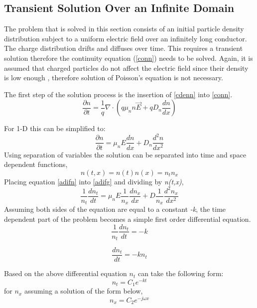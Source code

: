 \begin{doublespace}
\subsection{Transient Solution Over an Infinite Domain}

The problem that is solved in this section consists of an initial particle density distribution subject to a uniform electric field over an infinitely long conductor. The charge distribution drifts and diffuses over time. This requires a transient solution  therefore the continuity equation (\ref{conn}) needs to be solved. Again, it is assumed that charged particles do not affect the electric field since their density is low enough , therefore solution of Poisson's equation is not necessary. 

The first step of the solution process is the insertion of \eqref{cdenn} into \eqref{conn}.
\begin{equation}
\frac{\partial n}{\partial t} = \frac{1}{q}\nabla \cdot (q \mu_{n} n \vec{E}+qD_{n} \frac{dn}{dx} )
\end{equation}

For 1-D this can be simplified to:
\begin{equation}
\frac{\partial n}{\partial t} = \mu_n E \frac{d n}{d x}+D_{n}\frac{d^{2}n}{dx^{2}}
\label{adifg}
\end{equation}
Using separation of variables the solution can be separated into time and space dependent functions\cite{NumModel},
\begin{equation}
n(t,x)=n(t)n(x)=n_t n_x
\label{adifn}
\end{equation}
Placing equation \eqref{adifn} into \eqref{adifg} and dividing by \textit{n(t,x)},
\begin{equation}
\frac{1}{n_{t}}\frac{d n_{t}}{d t}=\mu_n E \frac{1}{n_{x}}\frac{d n_{x}}{dx}+D\frac{1}{n_{x}}\frac{d^2 n_{x}}{dx^2}
\label{Adif}
\end{equation}
Assuming both sides of the equation are equal to a constant \textit{-k}, the time dependent part of the problem becomes a simple first order differential equation.
\begin{equation}
\nonumber
\frac{1}{n_{t}}\frac{d n_{t}}{dt}=-k
\end{equation}

\begin{equation}
\nonumber
\frac{d n_{t}}{d t}=-kn_t
\end{equation}

Based on the above differential equation $n_t$ can take the following form:
\begin{equation}
n_t=C_1 e^{-kt}
\label{nt}
\end{equation}
 for $n_x$ assuming a solution of the form below,
\begin{equation}
n_x=C_2 e^{-j\omega x}
\label{nx}
\end{equation}


\end{doublespace}
